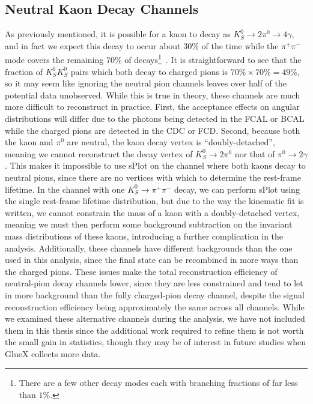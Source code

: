 \subsection{Neutral Kaon Decay Channels}\label{sub:neutral-kaon-decay-channels}
As previously mentioned, it is possible for a kaon to decay as $K_S^0 \to 2\pi^0 \to 4\gamma$, and in fact we expect this decay to occur about $30\%$ of the time while the $\pi^+\pi^-$ mode covers the remaining $70\%$ of decays\footnote{There are a few other decay modes each with branching fractions of far less than $1\%$.}~\cite{Zyla2020}. It is straightforward to see that the fraction of $K_S^0 K_S^0$ pairs which both decay to charged pions is $70\%\times 70\%=49\%$, so it may seem like ignoring the neutral pion channels leaves over half of the potential data unobserved. While this is true in theory, these channels are much more difficult to reconstruct in practice. First, the acceptance effects on angular distributions will differ due to the photons being detected in the FCAL or BCAL while the charged pions are detected in the CDC or FCD. Second, because both the kaon and $\pi^0$ are neutral, the kaon decay vertex is ``doubly-detached'', meaning we cannot reconstruct the decay vertex of $K_S^0 \to 2\pi^0$ nor that of $\pi^0 \to 2\gamma$. This makes it impossible to use sPlot on the channel where both kaons decay to neutral pions, since there are no vertices with which to determine the rest-frame lifetime. In the channel with one $K_S^0\to\pi^+\pi^-$ decay, we can perform sPlot using the single rest-frame lifetime distribution, but due to the way the kinematic fit is written, we cannot constrain the mass of a kaon with a doubly-detached vertex, meaning we must then perform some background subtraction on the invariant mass distributions of these kaons, introducing a further complication in the analysis. Additionally, these channels have different backgrounds than the one used in this analysis, since the final state can be recombined in more ways than the charged pions. These issues make the total reconstruction efficiency of neutral-pion decay channels lower, since they are less constrained and tend to let in more background than the fully charged-pion decay channel, despite the signal reconstruction efficiency being approximately the same across all channels. While we examined these alternative channels during the analysis, we have not included them in this thesis since the additional work required to refine them is not worth the small gain in statistics, though they may be of interest in future studies when GlueX collects more data.

